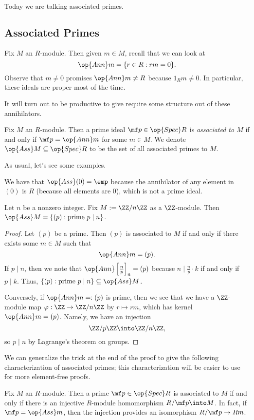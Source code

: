 
Today we are talking associated primes.

\subsection{Associated Primes}
Fix $M$ an $R$-module. Then given $m\in M$, recall that we can look at
\[\op{Ann}m=\{r\in R:rm=0\}.\]
Observe that $m\ne0$ promises $\op{Ann}m\ne R$ because $1_Rm\ne0$. In particular, these ideals are proper most of the time.

It will turn out to be productive to give require some structure out of these annihilators.
\begin{definition}
	Fix $M$ an $R$-module. Then a prime ideal $\mf p\in\op{Spec}R$ is \textit{associated to $M$} if and only if $\mf p=\op{Ann}m$ for some $m\in M$. We denote $\op{Ass}M\subseteq\op{Spec}R$ to be the set of all associated primes to $M$.
\end{definition}
As usual, let's see some examples.
\begin{example}
	We have that $\op{Ass}(0)=\emp$ because the annihilator of any element in $(0)$ is $R$ (because all elements are $0$), which is not a prime ideal.
\end{example}
\begin{exe} \label{exe:cyclicassociated}
	Let $n$ be a nonzero integer. Fix $M:=\ZZ/n\ZZ$ as a $\ZZ$-module. Then $\op{Ass}M=\{(p):\text{prime }p\mid n\}$.
\end{exe}
\begin{proof}
	Let $(p)$ be a prime. Then $(p)$ is associated to $M$ if and only if there exists some $m\in M$ such that
	\[\op{Ann}m=(p).\]
	If $p\mid n$, then we note that $\op{Ann}\left[\frac np\right]_n=(p)$ because $n\mid\frac np\cdot k$ if and only if $p\mid k$. Thus, $\{(p):\text{prime }p\mid n\}\subseteq\op{Ass}M$.
	
	Conversely, if $\op{Ann}m=:(p)$ is prime, then we see that we have a $\ZZ$-module map $\varphi:\ZZ\to\ZZ/n\ZZ$ by $r\mapsto rm$, which has kernel $\op{Ann}m=(p)$. Namely, we have an injection
	\[\ZZ/p\ZZ\into\ZZ/n\ZZ,\]
	so $p\mid n$ by Lagrange's theorem on groups.
\end{proof}
We can generalize the trick at the end of the proof to give the following characterization of associated primes; this characterization will be easier to use for more element-free proofs.
\begin{lemma} \label{lem:betterassociated}
	Fix $M$ an $R$-module. Then a prime $\mf p\in\op{Spec}R$ is associated to $M$ if and only if there is an injective $R$-module homomorphism $R/\mf p\into M$. In fact, if $\mf p=\op{Ass}m$, then the injection provides an isomorphism $R/\mf p\to Rm$.
\end{lemma}

